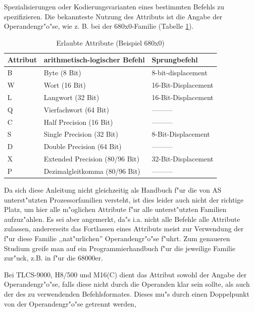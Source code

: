 \documentclass[12pt,a4paper,twoside]{report}
\newcommand{\asname}{AS}
\begin{document}
Spezialisierungen oder Kodierungsvarianten eines bestimmten Befehls zu
spezifizieren.  Die bekannteste Nutzung des Attributs ist die Angabe der
Operandengr"o"se, wie z. B. bei der 680x0-Familie (Tabelle
\ref{TabAttrs}).
\begin{table}[htb]
\begin{center}\begin{tabular}{|l|l|l|}
\hline
Attribut & arithmetisch-logischer Befehl & Sprungbefehl \\
\hline
\hline
B     & Byte (8 Bit)                   & 8-bit-displacement \\
W     & Wort (16 Bit)                  & 16-Bit-Displacement \\
L     & Langwort (32 Bit)              & 16-Bit-Displacement \\
Q     & Vierfachwort (64 Bit)          & --------- \\
C     & Half Precision (16 Bit)        & --------- \\
S     & Single Precision (32 Bit)      & 8-Bit-Displacement \\
D     & Double Precision (64 Bit)      & --------- \\
X     & Extended Precision (80/96 Bit) & 32-Bit-Displacement \\
P     & Dezimalgleitkomma (80/96 Bit)  & --------- \\
\hline
\end{tabular}\end{center}
\caption{Erlaubte Attribute (Beispiel 680x0) \label{TabAttrs}}
\end{table}
\par
Da sich diese Anleitung nicht gleichzeitig als Handbuch f"ur die von \asname{}
unterst"utzten Prozessorfamilien versteht, ist dies leider auch nicht der
richtige Platz, um hier alle m"oglichen Attribute f"ur alle unterst"utzten
Familien aufzuz"ahlen.  Es sei aber angemerkt, da"s i.a. nicht alle Befehle
alle Attribute zulassen, andererseits das Fortlassen eines Attributs meist
zur Verwendung der f"ur diese Familie ,,nat"urlichen'' Operandengr"o"se
f"uhrt.  Zum genaueren Studium greife man auf ein Programmierhandbuch f"ur
die jeweilige Familie zur"uck, z.B. in \cite{Williams} f"ur die 68000er.
\par
Bei TLCS-9000, H8/500 und M16(C) dient das Attribut sowohl der Angabe der
Operandengr"o"se, falls diese nicht durch die Operanden klar sein sollte,
als auch der des zu verwendenden Befehlsformates.
Dieses mu"s durch einen Doppelpunkt von der Operandengr"o"se getrennt werden,
\end{document}
